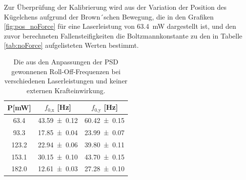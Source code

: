             \FloatBarrier
            Zur Überprüfung der Kalibrierung wird aus der Variation der Position des Kügelchens aufgrund der Brown´schen Bewegung, die in den Grafiken \ref{fig:pos_noForce} für eine Laserleistung von 
            \SI{63.4}{\milli\watt}
            dargestellt ist, und den zuvor berechneten Fallensteifigkeiten die Boltzmannkonstante zu den in Tabelle \ref{tab:noForce} aufgelisteten Werten bestimmt.
            \begin{table}[h]
                \centering
                \caption{Die aus den Anpassungen der PSD gewonnenen Roll-Off-Frequenzen bei verschiedenen Laserleistungen und keiner externen Krafteinwirkung.}
                \label{tab:f_0}
                \begin{tabular}{c c c}
                \toprule
                {P[mW]} &   {$f_{0\text{,x}}$ [Hz]} & {$f_{0\text{,y}}$ [Hz]}  \\
                \midrule
                \num{63.4}     &   \num{43.59 +- 0.12}	 &  \num{60.42 +- 0.15}  \\
                \num{93.3}     &   \num{17.85 +- 0.04}	 &  \num{23.99 +- 0.07}  \\
                \num{123.2}    &   \num{22.94 +- 0.06}	 &  \num{39.80 +- 0.11}  \\
                \num{153.1}    &   \num{30.15 +- 0.10}	 &  \num{43.70 +- 0.15}  \\
                \num{182.0}    &   \num{12.61 +- 0.03}	 &  \num{27.28 +- 0.10}  \\
                \bottomrule
                \end{tabular}
            \end{table}
